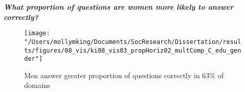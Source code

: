 \documentclass[]{article}
\begin{document}
\vspace{5mm}

\emph{\textbf{What proportion of questions are women more likely to answer correctly?}}
\begin{figure}[ht]
    \begin{center}
      \texttt{[image: "/Users/mollymking/Documents/SocResearch/Dissertation/results/figures/08\_vis/ki08\_vis03\_propHoriz02\_multComp\_C\_edu\_gender"]}
      \caption{Men answer greater proportion of questions correctly in 63\% of domains}
    \end{center}
\end{figure}
\end{document}
